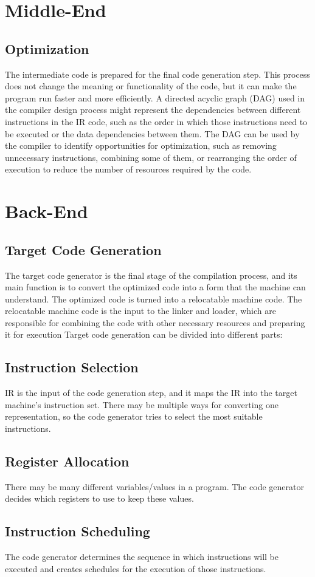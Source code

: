 \section{Middle-End}

\subsection{Optimization}
The intermediate code is prepared for the final code generation step. This process does not change the meaning or functionality of the code, but it can make the program run faster and more efficiently.
A directed acyclic graph (DAG) used in the compiler design process might represent the dependencies between different instructions in the IR code, such as the order in which those instructions need to be executed or the data dependencies between them. The DAG can be used by the compiler to identify opportunities for optimization, such as removing unnecessary instructions, combining some of them, or rearranging the order of execution to reduce the number of resources required by the code.

\section{Back-End}



\subsection{Target Code Generation}
The target code generator is the final stage of the compilation process, and its main function is to convert the optimized code into a form that the machine can understand. The optimized code is turned into a relocatable machine code. The relocatable machine code is the input to the linker and loader, which are responsible for combining the code with other necessary resources and preparing it for execution %
Target code generation can be divided into different parts:

\subsection{Instruction Selection} 
IR is the input of the code generation step, and it maps the IR into the target machine’s instruction set. There may be multiple ways for converting one representation, so the code generator tries to select the most suitable instructions.

\subsection{Register Allocation}
There may be many different variables/values in a program. The code generator decides which registers to use to keep these values.

\subsection{Instruction Scheduling}
The code generator determines the sequence in which instructions will be executed and creates schedules for the execution of those instructions.

